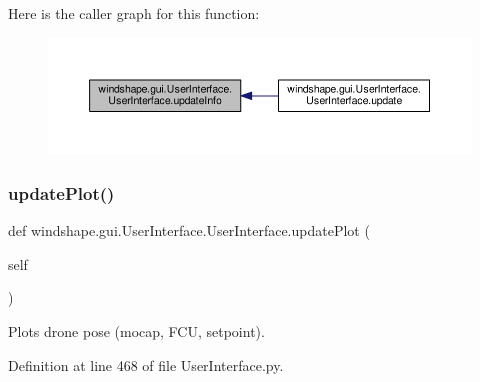 Here is the caller graph for this function\+:\nopagebreak
\begin{figure}[H]
\begin{center}
\leavevmode
\includegraphics[width=350pt]{classwindshape_1_1gui_1_1_user_interface_1_1_user_interface_a286ad19e8d76c02314769ce90e47513e_icgraph}
\end{center}
\end{figure}
\mbox{\label{classwindshape_1_1gui_1_1_user_interface_1_1_user_interface_a492252a536a8bc6328e97189dbf8ecbc}} 
\subsubsection{\texorpdfstring{update\+Plot()}{updatePlot()}}
{\footnotesize\ttfamily def windshape.\+gui.\+User\+Interface.\+User\+Interface.\+update\+Plot (\begin{DoxyParamCaption}\item[{}]{self }\end{DoxyParamCaption})}

\begin{DoxyVerb}Plots drone pose (mocap, FCU, setpoint).\end{DoxyVerb}
 

Definition at line 468 of file User\+Interface.\+py.

